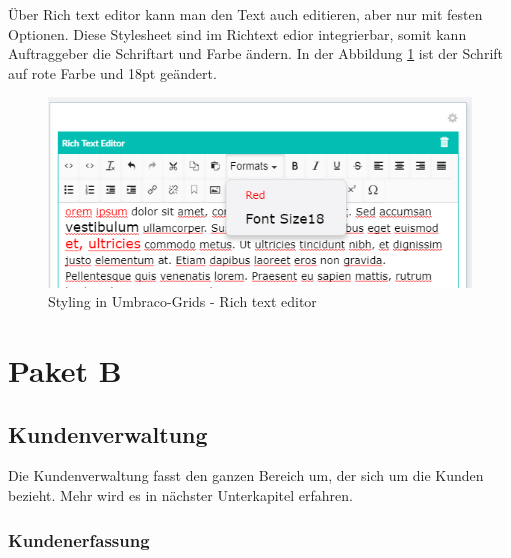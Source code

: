 Über Rich text editor kann man den Text auch editieren, aber nur mit festen Optionen. 
Diese Stylesheet sind im Richtext edior integrierbar, somit kann Auftraggeber die Schriftart und Farbe ändern. In der Abbildung \ref{fig:schriftManip} ist der Schrift auf rote Farbe und 18pt geändert.

 \begin{figure}[h]
	\centering
	\includegraphics[width=0.6\linewidth]{Graphics/schriftManip.png}
	\caption[StylingGrind]{Styling in Umbraco-Grids - Rich text editor}
	\label{fig:schriftManip}
\end{figure}

\section{Paket B}

\subsection{Kundenverwaltung}
Die Kundenverwaltung fasst den ganzen Bereich um, der sich um die Kunden bezieht. Mehr wird es in nächster Unterkapitel erfahren.

\subsubsection{Kundenerfassung}

